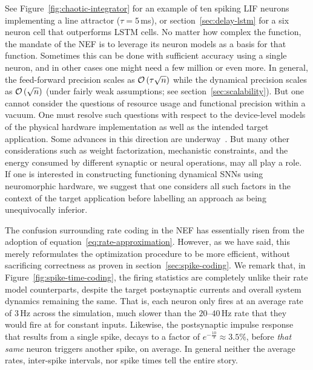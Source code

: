 See Figure~\ref{fig:chaotic-integrator} for an example of ten spiking LIF neurons implementing a line attractor ($\tau = 5$\,ms), or section~\ref{sec:delay-lstm} for a six neuron cell that outperforms LSTM cells.
No matter how complex the function, the mandate of the NEF is to leverage its neuron models as a basis for that function. 
Sometimes this can be done with sufficient accuracy using a single neuron, and in other cases one might need a few million or even more.
In general, the feed-forward precision scales as $\mathcal{O}\left({\tau \sqrt{n}}\right)$ while the dynamical precision scales as $\mathcal{O}\left({\sqrt{n}}\right)$ (under fairly weak assumptions; see section~\ref{sec:scalability}).
But one cannot consider the questions of resource usage and functional precision within a vacuum.
One must resolve such questions with respect to the device-level models of the physical hardware implementation as well as the intended target application.
Some advances in this direction are underway~\citep{schwemmer2015constructing, thalmeier2016learning}.
But many other considerations such as weight factorization, mechanistic constraints, and the energy consumed by different synaptic or neural operations, may all play a role.
If one is interested in constructing functioning dynamical SNNs using neuromorphic hardware, we suggest that one considers all such factors in the context of the target application before labelling an approach as being unequivocally inferior.

The confusion surrounding rate coding in the NEF has essentially risen from the adoption of equation~\ref{eq:rate-approximation}.
However, as we have said, this merely reformulates the optimization procedure to be more efficient, without sacrificing correctness as proven in section~\ref{sec:spike-coding}.
We remark that, in Figure~\ref{fig:spike-time-coding}, the firing statistics are completely unlike their rate model counterparts, despite the target postsynaptic currents and overall system dynamics remaining the same.
That is, each neuron only fires at an average rate of $3$\,Hz across the simulation, much slower than the $20$--$40$\,Hz rate that they would fire at for constant inputs.
Likewise, the postsynaptic impulse response that results from a single spike, decays to a factor of $e^{-\frac{10}{3}} \approx 3.5\%$, before \emph{that same} neuron triggers another spike, on average.
In general neither the average rates, inter-spike intervals, nor spike times tell the entire story.

